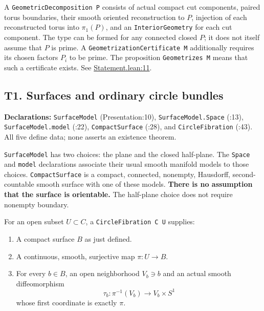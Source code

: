 \documentclass[
  letterpaper,
  11pt]{article}
\providecommand{\tightlist}{%
  \setlength{\itemsep}{0pt}\setlength{\parskip}{0pt}}
\begin{document}
A {\small\texttt{Geometric\allowbreak{}Decomposition P}} consists of
actual compact cut components, paired torus boundaries, their smooth
oriented reconstruction to \(P\), injection of each reconstructed torus
into \(\pi_1(P)\), and an {\small\texttt{Interior\allowbreak{}Geometry}}
for each cut component. The type can be formed for any connected closed
\(P\); it does not itself assume that \(P\) is prime. A
{\small\texttt{Geometrization\allowbreak{}Certificate M}} additionally
requires its chosen factors \(P_i\) to be prime. The proposition
{\small\texttt{Geometrizes M}} means that such a certificate exists. See
\href{https://github.com/qinz1yang/differential-geometry-dev/blob/ea0fae60ee01ef8c8d9b57a51794c6538f679c5d/DifferentialGeometry/Topology/ThreeManifold/Geometrization/Statement.lean\#L11}{Statement.lean:11}.

\subsection{T1. Surfaces and ordinary circle bundles}\label{t1}

\textbf{Declarations:} {\small\texttt{Surface\allowbreak{}Model}}
(Presentation:10),
{\small\texttt{Surface\allowbreak{}Model.\allowbreak{}Space}} (:13),
{\small\texttt{Surface\allowbreak{}Model.\allowbreak{}model}} (:22),
{\small\texttt{Compact\allowbreak{}Surface}} (:28), and
{\small\texttt{Circle\allowbreak{}Fibration}} (:43). All five define
data; none asserts an existence theorem.

{\small\texttt{Surface\allowbreak{}Model}} has two choices: the plane
and the closed half-plane. The {\small\texttt{Space}} and
{\small\texttt{model}} declarations associate their usual smooth
manifold models to those choices.
{\small\texttt{Compact\allowbreak{}Surface}} is a compact, connected,
nonempty, Hausdorff, second-countable smooth surface with one of these
models. \textbf{There is no assumption that the surface is orientable.}
The half-plane choice does not require nonempty boundary.

For an open subset \(U\subset C\), a
{\small\texttt{Circle\allowbreak{}Fibration C U}} supplies:

\begin{enumerate}
\def\labelenumi{\arabic{enumi}.}
\tightlist
\item
  A compact surface \(B\) as just defined.
\item
  A continuous, smooth, surjective map \(\pi:U\to B\).
\item
  For every \(b\in B\), an open neighborhood \(V_b\ni b\) and an actual
  smooth diffeomorphism \[
       \tau_b:\pi^{-1}(V_b)\longrightarrow V_b\times S^1
  \] whose first coordinate is exactly \(\pi\).
\end{enumerate}
\end{document}

